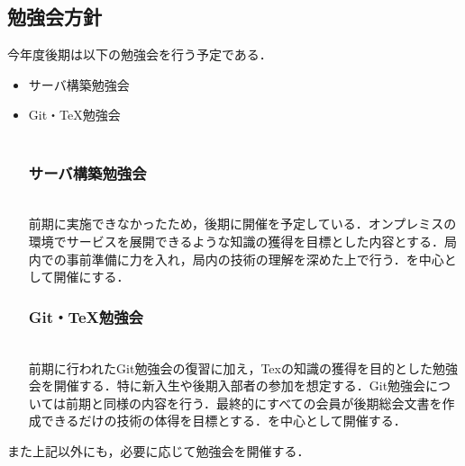 \subsection*{勉強会方針}


今年度後期は以下の勉強会を行う予定である．
\begin{itemize}
    \item サーバ構築勉強会
\item Git・TeX勉強会
\\\\
    \subsubsection*{サーバ構築勉強会}
    \\前期に実施できなかったため，後期に開催を予定している．オンプレミスの環境でサービスを展開できるような知識の獲得を目標とした内容とする．局内での事前準備に力を入れ，局内の技術の理解を深めた上で行う．\secondGrade{}を中心として開催にする．
\subsubsection*{Git・TeX勉強会}
    \\前期に行われたGit勉強会の復習に加え，Texの知識の獲得を目的とした勉強会を開催する．特に新入生や後期入部者の参加を想定する．Git勉強会については前期と同様の内容を行う．最終的にすべての会員が後期総会文書を作成できるだけの技術の体得を目標とする．\secondgrade{}を中心として開催する．
\end{itemize}
また上記以外にも，必要に応じて勉強会を開催する．

